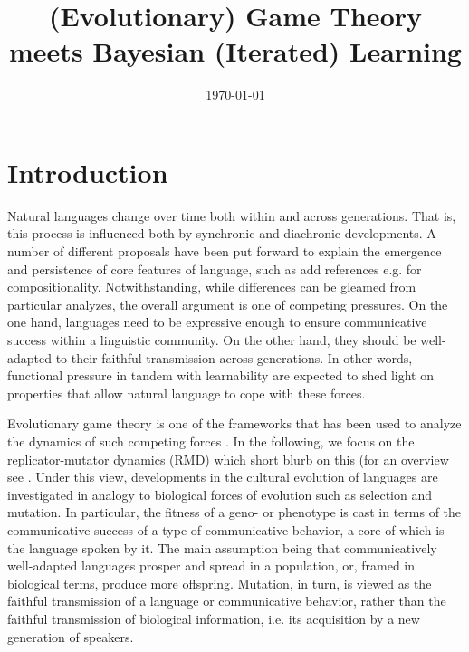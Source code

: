 \documentclass[12pt]{article}
\newcommand{\hloranj}[1]{\textcolor[rgb]{.8,.33,.0}{#1}}%
\begin{document}
\title{(Evolutionary) Game Theory meets Bayesian (Iterated) Learning}
\date{\today}

\maketitle
\tableofcontents 


\section{Introduction}
Natural languages change over time both within and across generations. That is, this process is influenced both by synchronic and diachronic developments. A number of different proposals have been put forward to explain the emergence and persistence of core features of language, such as \hloranj{add references e.g. for compositionality.} Notwithstanding, while differences can be gleamed from particular analyzes, the overall argument is one of competing pressures. On the one hand, languages need to be expressive enough to ensure communicative success within a linguistic community. On the other hand, they should be well-adapted to their faithful transmission across generations. In other words, functional pressure in tandem with learnability are expected to shed light on properties that allow natural language to cope with these forces. 

Evolutionary game theory is one of the frameworks that has been used to analyze the dynamics of such competing forces \citep{nowak+krakauer:1999,huttegger+zollman:2013}. In the following, we focus on the replicator-mutator dynamics (RMD) which \hloranj{short blurb on this} (for an overview see \citealt{hofbauer+sigmund:2003}. Under this view, developments in the cultural evolution of languages are investigated in analogy to biological forces of evolution such as selection and mutation. In particular, the fitness of a geno- or phenotype is cast in terms of the communicative success of a type of communicative behavior, a core of which is the language spoken by it. The main assumption being that communicatively well-adapted languages prosper and spread in a population, or, framed in biological terms, produce more offspring. Mutation, in turn, is viewed as the faithful transmission of a language or communicative behavior, rather than the faithful transmission of biological information, i.e. its acquisition by a new generation of speakers. 
\end{document}
